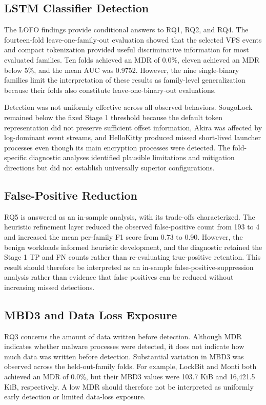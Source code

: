 \subsection{\textmu{}LSTM Classifier Detection}\label{sec:5.1.1}

The LOFO findings provide conditional answers to RQ1, RQ2, and RQ4. The fourteen-fold leave-one-family-out evaluation showed that the selected VFS events and compact tokenization provided useful discriminative information for most evaluated families. Ten folds achieved an MDR of 0.0\%, eleven achieved an MDR below 5\%, and the mean AUC was 0.9752. However, the nine single-binary families limit the interpretation of these results as family-level generalization because their folds also constitute leave-one-binary-out evaluations.

Detection was not uniformly effective across all observed behaviors. SougoLock remained below the fixed Stage 1 threshold because the default token representation did not preserve sufficient offset information, Akira was affected by log-dominant event streams, and HelloKitty produced missed short-lived launcher processes even though its main encryption processes were detected. The fold-specific diagnostic analyses identified plausible limitations and mitigation directions but did not establish universally superior configurations.

\subsection{False-Positive Reduction}\label{sec:5.1.2}

RQ5 is answered as an in-sample analysis, with its trade-offs characterized. The heuristic refinement layer reduced the observed false-positive count from 193 to 4 and increased the mean per-family F1 score from 0.73 to 0.90. However, the benign workloads informed heuristic development, and the diagnostic retained the Stage 1 TP and FN counts rather than re-evaluating true-positive retention. This result should therefore be interpreted as an in-sample false-positive-suppression analysis rather than evidence that false positives can be reduced without increasing missed detections.

\subsection{MBD3 and Data Loss Exposure}\label{sec:5.1.3}

RQ3 concerns the amount of data written before detection. Although MDR indicates whether malware processes were detected, it does not indicate how much data was written before detection. Substantial variation in MBD3 was observed across the held-out-family folds. For example, LockBit and Monti both achieved an MDR of 0.0\%, but their MBD3 values were 103.7 KiB and 16,421.5 KiB, respectively. A low MDR should therefore not be interpreted as uniformly early detection or limited data-loss exposure.

